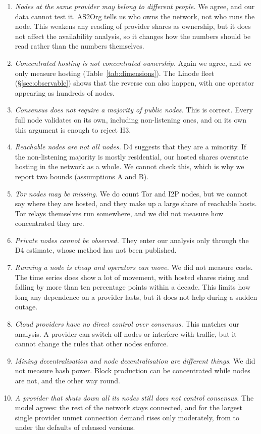 \documentclass[10pt,a4paper]{article}
\begin{document}
\begin{enumerate}
\item \emph{Nodes at the same provider may belong to different people.} We agree, and our data cannot test it. AS2Org tells us who owns the network, not who runs the node. This weakens any reading of provider shares as ownership, but it does not affect the availability analysis, so it changes how the numbers should be read rather than the numbers themselves.
\item \emph{Concentrated hosting is not concentrated ownership.} Again we agree, and we only measure hosting (Table~\ref{tab:dimensions}). The Linode fleet (\S\ref{sec:observable}) shows that the reverse can also happen, with one operator appearing as hundreds of nodes.
\item \emph{Consensus does not require a majority of public nodes.} This is correct. Every full node validates on its own, including non-listening ones, and on its own this argument is enough to reject H3.
\item \emph{Reachable nodes are not all nodes.} D4 suggests that they are a minority. If the non-listening majority is mostly residential, our hosted shares overstate hosting in the network as a whole. We cannot check this, which is why we report two bounds (assumptions A and B).
\item \emph{Tor nodes may be missing.} We do count Tor and I2P nodes, but we cannot say where they are hosted, and they make up a large share of reachable hosts. Tor relays themselves run somewhere, and we did not measure how concentrated they are.
\item \emph{Private nodes cannot be observed.} They enter our analysis only through the D4 estimate, whose method has not been published.
\item \emph{Running a node is cheap and operators can move.} We did not measure costs. The time series does show a lot of movement, with hosted shares rising and falling by more than ten percentage points within a decade. This limits how long any dependence on a provider lasts, but it does not help during a sudden outage.
\item \emph{Cloud providers have no direct control over consensus.} This matches our analysis. A provider can switch off nodes or interfere with traffic, but it cannot change the rules that other nodes enforce.
\item \emph{Mining decentralisation and node decentralisation are different things.} We did not measure hash power. Block production can be concentrated while nodes are not, and the other way round.
\item \emph{A provider that shuts down all its nodes still does not control consensus.} The model agrees: the rest of the network stays connected, and for the largest single provider unmet connection demand rises only moderately, from \UnmetRelBase{} to \UnmetRelProv{} under the defaults of released versions.
\end{enumerate}
\end{document}
